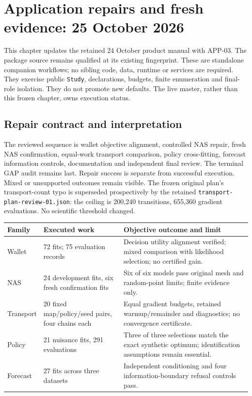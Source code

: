 \chapter{Application repairs and fresh evidence: 25 October 2026}
\label{sec:app03-repairs}
This chapter updates the retained 24 October product manual with APP-03.
The package source remains qualified at its existing fingerprint. These are
standalone companion workflows; no sibling code, data, runtime or services
are required. They exercise public \texttt{Study}, declarations, budgets,
finite enumeration and final-role isolation. They do not promote new defaults.
The live master, rather than this frozen chapter, owns execution status.

\section{Repair contract and interpretation}
The reviewed sequence is wallet objective alignment, controlled NAS repair,
fresh NAS confirmation, equal-work transport comparison, policy cross-fitting,
forecast information controls, documentation and independent final review.
The terminal GAP audit remains last. Repair success is separate from successful
execution. Mixed or unsupported outcomes remain visible. The frozen original
plan's transport-count typo is superseded prospectively by the retained
\texttt{transport-plan-review-01.json}: the ceiling is 200,240 transitions,
655,360 gradient evaluations. No scientific threshold changed.

\begin{longtable}{p{}p{}p{}}
\toprule Family & Executed work & Objective outcome and limit\\\midrule
Wallet & 72 fits; 75 evaluation records & Decision utility alignment verified;
mixed comparison with likelihood selection; no certified gain.\\
NAS & 24 development fits, six fresh confirmation fits & Six of six models
pass original mesh and random-point limits; finite evidence only.\\
Transport & 20 fixed map/policy/seed pairs, four chains each & Equal gradient
budgets, retained warmup/remainder and diagnostics; no convergence certificate.\\
Policy & 21 nuisance fits, 291 evaluations & Three of three selections match
the exact synthetic optimum; identification assumptions remain essential.\\
Forecast & 27 fits across three datasets & Independent conditioning and
four information-boundary refusal controls pass.\\\bottomrule
\end{longtable}

